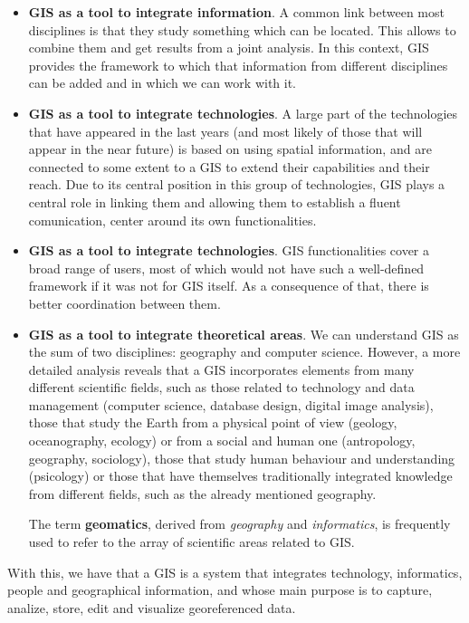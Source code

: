 \begin{itemize}
\item \textbf{GIS as a tool to integrate information}. A common link between most disciplines is that they study something which can be located. This allows to combine them and get results from a joint analysis. In this context, GIS provides the framework to which that information from different disciplines can be added and in which we can work with it. 

\item \textbf{GIS as a tool to integrate technologies}. A large part of the technologies that have appeared in the last years (and most likely of those that will appear in the near future) is based on using spatial information, and are connected to some extent to a GIS to extend their capabilities and their reach. Due to its central position in this group of technologies, GIS plays a central role in linking them and allowing them to establish a fluent comunication, center around its own functionalities.


\item \textbf{GIS as a tool to integrate technologies}. GIS functionalities cover a broad range of users, most of which would not have such a well-defined framework if it was not for GIS itself. As a consequence of that, there is  better coordination between them.

\item \textbf{GIS as a tool to integrate theoretical areas}. We can understand GIS as the sum of two disciplines: geography and computer science. However, a more detailed analysis reveals that a GIS incorporates elements from many different scientific fields, such as those related to technology and data management (computer science, database design, digital image analysis), those that study the Earth from a physical point of view (geology, oceanography, ecology) or from a social and human one (antropology, geography, sociology), those that study human behaviour and understanding (psicology) or those that have themselves traditionally integrated knowledge from different fields, such as the already mentioned geography.

The term \textbf{geomatics}, derived from \emph{geography} and \emph{informatics}, is frequently used to refer to the array of scientific areas related to GIS.
\end{itemize}

With this, we have that a GIS is a system that integrates technology, informatics, people and geographical information, and whose main purpose is to capture, analize, store, edit and visualize georeferenced data.


